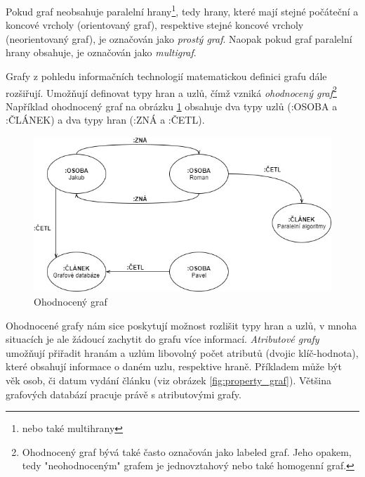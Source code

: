 Pokud graf neobsahuje paralelní hrany\footnote{nebo také multihrany}, tedy hrany, které mají stejné počáteční a koncové vrcholy (orientovaný graf), respektive stejné koncové vrcholy (neorientovaný graf), je označován jako \textit{prostý graf}. Naopak pokud graf paralelní hrany obsahuje, je označován jako \textit{multigraf}.\cite{Demlova17}

Grafy z pohledu informačních technologií matematickou definici grafu dále rozšiřují. Umožňují definovat typy hran a uzlů, čímž vzniká \textit{ohodnocený graf}\footnote{Ohodnocený graf bývá také často označován jako labeled graf. Jeho opakem, tedy "neohodnoceným" grafem je jednovztahový nebo také homogenní graf.} Například ohodnocený graf na obrázku \ref{fig:labeled_graf} obsahuje dva typy uzlů (:OSOBA a :ČLÁNEK) a dva typy hran (:ZNÁ a :ČETL).

\begin{figure}
\begin{center}
\includegraphics[width=14cm]{figures/labeled_graph}
\caption{Ohodnocený graf}
\label{fig:labeled_graf}
\end{center}
\end{figure}

Ohodnocené grafy nám sice poskytují možnost rozlišit typy hran a uzlů, v mnoha situacích je ale žádoucí zachytit do grafu více informací. \textit{Atributové grafy} umožňují přiřadit hranám a uzlům libovolný počet atributů (dvojic klíč-hodnota), které obsahují informace o daném uzlu, respektive hraně. Příkladem může být věk osob, či datum vydání článku (viz obrázek \ref{fig:property_graf}). Většina grafových databází pracuje právě s atributovými grafy.\cite{Lal15}

